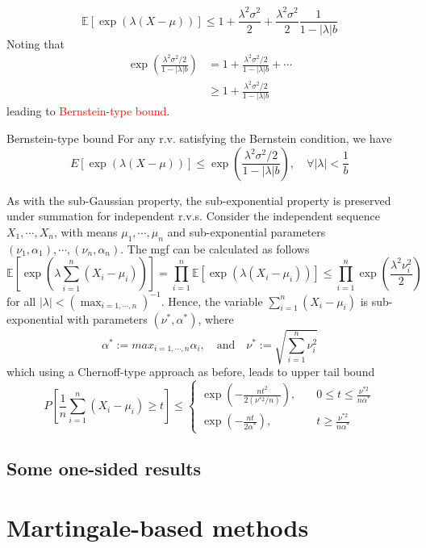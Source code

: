 \documentclass[10pt,handout,english]{beamer}
\newcommand{\E}{\mathbb{E}}
\begin{document}
\begin{frame}[allowframebreaks]
\[
\E[\exp(\lambda(X-\mu))]\leq 1+\frac{\lambda^2\sigma^2}{2}+\frac{\lambda^2\sigma^2}{2}\frac{1}{1-\lvert\lambda\rvert b}
\]
Noting that 
\begin{align*}
\exp\left(\frac{\lambda^2\sigma^2/2}{1-\lvert\lambda\rvert b}\right)&=1+\frac{\lambda^2\sigma^2/2}{1-\lvert\lambda\rvert b}+\cdots\\
&\geq 1+\frac{\lambda^2\sigma^2/2}{1-\lvert\lambda\rvert b}
\end{align*}
leading to \textcolor{red}{Bernstein-type bound}.
\begin{block}{Bernstein-type bound}
For any r.v. satisfying the Bernstein condition, we have
\[
E[\exp(\lambda(X-\mu))]\leq \exp\left(\frac{\lambda^2\sigma^2/2}{1-\lvert\lambda\rvert b}\right),\quad \forall\lvert\lambda\rvert<\frac{1}{b}
\]
\end{block}

As with the sub-Gaussian property, the sub-exponential property is preserved under summation for independent r.v.s. Consider the independent sequence $X_1,\cdots,X_n$, with means $\mu_1,\cdots,\mu_n$ and sub-exponential parameters $(\nu_1,\alpha_1),\cdots,(\nu_n,\alpha_n)$. The mgf can be calculated as follows
\[
\E\left[\exp\left(\lambda\sum_{i=1}^n(X_i-\mu_i)\right)\right]=\prod\limits_{i=1}^n\E[\exp(\lambda(X_i-\mu_i))]\leq \prod\limits_{i=1}^n\exp\left(\frac{\lambda^2\nu_i^2}{2}\right)
\]
for all $\lvert\lambda\rvert<(\max_{i=1,\cdots,n})^{-1}$. Hence, the variable $\sum_{i=1}^n(X_i-\mu_i)$ is sub-exponential with parameters $(\nu^*,\alpha^*)$, where 
\[
\alpha^*:=max_{i=1,\cdots,n}\alpha_i,\quad\text{and}\quad\nu^*:=\sqrt{\sum\limits_{i=1}^{n}\nu_i^2}
\]
which  using a Chernoff-type approach as before, leads to upper tail bound
\[
P\left[\frac{1}{n}\sum\limits_{i=1}^{n}(X_i-\mu_i)\geq t\right]\leq
\begin{cases}
\exp\left(-\frac{nt^2}{2(\nu^{*2}/n)}\right),\quad &0\leq t\leq \frac{\nu^{*2}}{n\alpha^*}\\
\exp\left(-\frac{nt}{2\alpha^{*}}\right),\quad &t\geq \frac{\nu^{*2}}{n\alpha^*}
\end{cases}
\]
\end{frame}


\subsection{Some one-sided results}

\section{Martingale-based methods}
\end{document}

